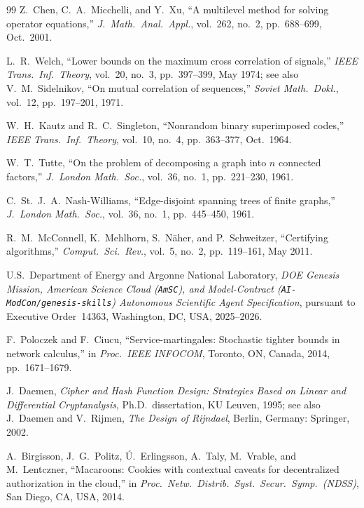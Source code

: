 \documentclass[10pt,twocolumn]{article}
\theoremstyle{spectralthm}
\begin{document}
\begin{thebibliography}{99}
Z.~Chen, C.~A.~Micchelli, and Y.~Xu, ``A multilevel method for solving operator equations,'' \textit{J.\ Math.\ Anal.\ Appl.}, vol.~262, no.~2, pp.~688--699, Oct.\ 2001.

L.~R.~Welch, ``Lower bounds on the maximum cross correlation of signals,'' \textit{IEEE Trans.\ Inf.\ Theory}, vol.~20, no.~3, pp.~397--399, May 1974; see also V.~M.~Sidelnikov, ``On mutual correlation of sequences,'' \textit{Soviet Math.\ Dokl.}, vol.~12, pp.~197--201, 1971.

W.~H.~Kautz and R.~C.~Singleton, ``Nonrandom binary superimposed codes,'' \textit{IEEE Trans.\ Inf.\ Theory}, vol.~10, no.~4, pp.~363--377, Oct.\ 1964.

W.~T.~Tutte, ``On the problem of decomposing a graph into $n$ connected factors,'' \textit{J.\ London Math.\ Soc.}, vol.~36, no.~1, pp.~221--230, 1961.

C.~St.~J.~A.~Nash-Williams, ``Edge-disjoint spanning trees of finite graphs,'' \textit{J.\ London Math.\ Soc.}, vol.~36, no.~1, pp.~445--450, 1961.

R.~M.~McConnell, K.~Mehlhorn, S.~N\"{a}her, and P.~Schweitzer, ``Certifying algorithms,'' \textit{Comput.\ Sci.\ Rev.}, vol.~5, no.~2, pp.~119--161, May 2011.

U.S.\ Department of Energy and Argonne National Laboratory, \textit{DOE Genesis Mission, American Science Cloud (\texttt{AmSC}), and Model-Contract (\texttt{AI-ModCon/genesis-skills}) Autonomous Scientific Agent Specification}, pursuant to Executive Order~14363, Washington, DC, USA, 2025--2026.

F.~Poloczek and F.~Ciucu, ``Service-martingales: Stochastic tighter bounds in network calculus,'' in \textit{Proc.\ IEEE INFOCOM}, Toronto, ON, Canada, 2014, pp.~1671--1679.

J.~Daemen, \textit{Cipher and Hash Function Design: Strategies Based on Linear and Differential Cryptanalysis}, Ph.D.\ dissertation, KU Leuven, 1995; see also J.~Daemen and V.~Rijmen, \textit{The Design of Rijndael}, Berlin, Germany: Springer, 2002.

A.~Birgisson, J.~G.~Politz, \'{U}.~Erlingsson, A.~Taly, M.~Vrable, and M.~Lentczner, ``Macaroons: Cookies with contextual caveats for decentralized authorization in the cloud,'' in \textit{Proc.\ Netw.\ Distrib.\ Syst.\ Secur.\ Symp.\ (NDSS)}, San Diego, CA, USA, 2014.


\end{thebibliography}
\end{document}
